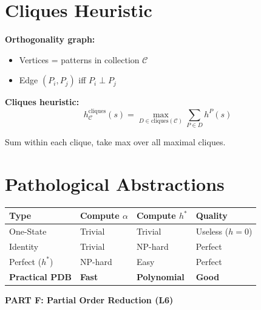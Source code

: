 \documentclass[11pt,a4paper]{article}
\begin{document}
\section{Cliques Heuristic}

\begin{definitionbox}
\textbf{Orthogonality graph:}
\begin{itemize}[leftmargin=*,nosep]
\item Vertices = patterns in collection $\mathcal{C}$
\item Edge $(P_i, P_j)$ iff $P_i \perp P_j$
\end{itemize}

\textbf{Cliques heuristic:}
\[h^{\text{cliques}}_{\mathcal{C}}(s) = \max_{D \in \text{cliques}(\mathcal{C})} \sum_{P \in D} h^P(s)\]

Sum within each clique, take max over all maximal cliques.
\end{definitionbox}

\section{Pathological Abstractions}

\begin{definitionbox}
\begin{center}
\begin{tabular}{@{}llll@{}}
\toprule
\textbf{Type} & \textbf{Compute $\alpha$} & \textbf{Compute $h^*$} & \textbf{Quality} \\
\midrule
One-State & Trivial & Trivial & Useless ($h=0$) \\
Identity & Trivial & NP-hard & Perfect \\
Perfect ($h^*$) & NP-hard & Easy & Perfect \\
\midrule
\textbf{Practical PDB} & \textbf{Fast} & \textbf{Polynomial} & \textbf{Good} \\
\bottomrule
\end{tabular}
\end{center}
\end{definitionbox}

\newpage
\begin{center}
\textbf{\LARGE PART F: Partial Order Reduction (L6)}
\end{center}
\vspace{1em}
\end{document}
